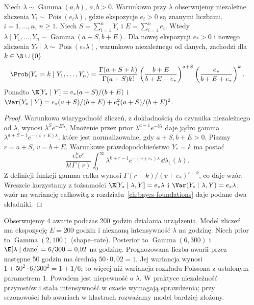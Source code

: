 \begin{twierdzenie}
\label{thm:gamma-poisson}
Niech $\lambda\sim\operatorname{Gamma}(a,b)$,
$a,b>0$. Warunkowo przy $\lambda$ obserwujemy niezależne
zliczenia $Y_i\sim\operatorname{Pois}(e_i\lambda)$,
gdzie ekspozycje $e_i>0$ są znanymi liczbami,
$i=1,\ldots,n$, $n\ge1$. Niech $S=\sum_{i=1}^nY_i$
i $E=\sum_{i=1}^ne_i$. Wtedy
$\lambda\mid Y_1,\ldots,Y_n\sim\operatorname{Gamma}(a+S,b+E)$.
Dla nowej ekspozycji $e_*>0$ i nowego zliczenia
$Y_*\mid\lambda\sim\operatorname{Pois}(e_*\lambda)$,
warunkowo niezależnego od danych, zachodzi dla $k\in\N\cup\{0\}$
\[
 \Prob(Y_*=k\mid Y_1,\ldots,Y_n)
 =\frac{\Gamma(a+S+k)}{\Gamma(a+S)k!}
 \left(\frac{b+E}{b+E+e_*}\right)^{a+S}
 \left(\frac{e_*}{b+E+e_*}\right)^k.
\]
Ponadto $\E[Y_*\mid Y]=e_*(a+S)/(b+E)$ i
$\Var(Y_*\mid Y)=e_*(a+S)/(b+E)
+e_*^2(a+S)/(b+E)^2$.
\end{twierdzenie}
\begin{proof}
Warunkowa wiarygodność zliczeń, z dokładnością do
czynnika niezależnego od $\lambda$, wynosi
$\lambda^Se^{-E\lambda}$. Mnożenie przez prior
$\lambda^{a-1}e^{-b\lambda}$ daje jądro gamma
$\lambda^{a+S-1}e^{-(b+E)\lambda}$, które jest
normalizowalne, gdy $a+S,b+E>0$.
Piszmy $r=a+S$, $v=b+E$. Warunkowe prawdopodobieństwo
$Y_*=k$ ma postać
\[
 \frac{e_*^kv^r}{k!\Gamma(r)}
 \int_0^\infty\lambda^{k+r-1}
 e^{-(v+e_*)\lambda}\,\dd\lambda_1(\lambda).
\]
Z definicji funkcji gamma całka wynosi
$\Gamma(r+k)/(v+e_*)^{r+k}$, co daje wzór.
Wreszcie korzystamy z tożsamości
$\E[Y_*\mid\lambda,Y]=e_*\lambda$ i
$\Var(Y_*\mid\lambda,Y)=e_*\lambda$;
wzór na wariancję całkowitą z rozdziału~\ref{ch:bayes-foundations}
daje podane dwa składniki.
\end{proof}

\begin{przyklad}
Obserwujemy 4 awarie podczas 200 godzin działania urządzenia.
Model zliczeń ma ekspozycję $E=200$ godzin i nieznaną
intensywność $\lambda$ na godzinę. Niech prior to
$\operatorname{Gamma}(2,100)$ (shape--rate).
Posterior to $\operatorname{Gamma}(6,300)$ i
$\E[\lambda\mid\mathrm{dane}]=6/300=0{,}02$ na godzinę.
Prognozowana liczba awarii przez następne 50 godzin ma średnią
$50\cdot0{,}02=1$. Jej wariancja wynosi
$1+50^2\cdot 6/300^2=1+1/6$; to więcej niż
wariancja rozkładu Poissona z ustalonym parametrem $1$.
Powodem jest niepewność o $\lambda$.
W praktyce niezależność przyrostów i stała intensywność
w czasie wymagają sprawdzenia; przy sezonowości lub awariach
w klastrach rozważamy model bardziej złożony.
\end{przyklad}

